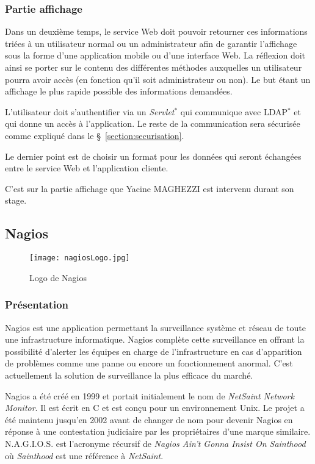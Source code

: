 \subsubsection{Partie affichage}

Dans un deuxi\`eme temps, le service Web doit pouvoir retourner ces informations tri\'ees \`a un utilisateur normal ou un administrateur afin de garantir l'affichage sous la forme d'une application mobile ou d'une interface Web.
La r\'eflexion doit ainsi se porter sur le contenu des diff\'erentes m\'ethodes auxquelles un utilisateur pourra avoir acc\`es (en fonction qu'il soit administrateur ou non).
Le but \'etant un affichage le plus rapide possible des informations demand\'ees.

L'utilisateur doit s'authentifier via un \textit{Servlet}$^*$ qui communique avec LDAP$^*$ et qui donne un acc\`es \`a l'application.
Le reste de la communication sera s\'ecuris\'ee comme expliqu\'e dans le \S~\ref{section:securisation}.

Le dernier point est de choisir un format pour les donn\'ees qui seront \'echang\'ees entre le service Web et l'application cliente.

C'est sur la partie affichage que Yacine MAGHEZZI est intervenu durant son stage.

\subsection{Nagios}
\label{section:nagios}

\begin{figure}[!ht]
	\centering
	\texttt{[image: nagiosLogo.jpg]}
	\caption{Logo de Nagios}

\end{figure}

\subsubsection{Pr\'esentation}

Nagios est une application permettant la surveillance syst\`eme et r\'eseau de toute une infrastructure informatique.
Nagios compl\`ete cette surveillance en offrant la possibilit\'e d'alerter les \'equipes en charge de l'infrastructure en cas d'apparition de probl\`emes comme une panne ou encore un fonctionnement anormal.
C'est actuellement la solution de surveillance la plus efficace du march\'e.

Nagios a \'et\'e cr\'e\'e en 1999 et portait initialement le nom de \textit{NetSaint Network Monitor}.
Il est \'ecrit en C et est con\c{c}u pour un environnement Unix.
Le projet a \'et\'e maintenu jusqu'en 2002 avant de changer de nom pour devenir Nagios en r\'eponse \`a une contestation judiciaire par les propri\'etaires d'une marque similaire.
N.A.G.I.O.S. est l'acronyme r\'ecursif de \og{}\textit{Nagios Ain't Gonna Insist On Sainthood}\fg{} o\`u \textit{Sainthood} est une r\'ef\'erence \`a \textit{NetSaint}.

